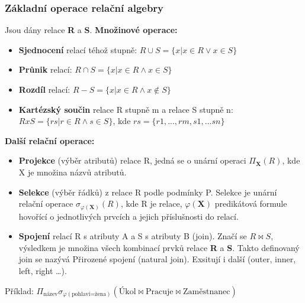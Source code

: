 \subsubsection{Základní operace relační algebry}
Jsou dány relace \textbf{R} a \textbf{S}. \textbf{Množinové operace:}
\begin{itemize}
\item \textbf{Sjednocení} relací téhož stupně:      $R \cup S = \{x | x \in R \vee x \in S\}$
\item \textbf{Průnik} relací:                                 $R \cap S = \{x | x \in R \wedge x \in S\}$
\item \textbf{Rozdíl} relací:                                   $R  -  S = \{x | x \in R \wedge x \notin S\}$
\item \textbf{Kartézský součin} relace R stupně m a relace S stupně n: $R x S = \{rs | r \in R \wedge s \in S\}$,  kde  $rs = \{r1,...,rm,s1,...sn\}$
\end{itemize}
\textbf{Další relační operace: }
\begin{itemize}
\item \textbf{Projekce} (výběr atributů) relace R, jedná se o unární operaci $\Pi_\mathbf{X}( R )$, kde X je množina názvů atributů.
\item \textbf{Selekce} (výběr řádků) z relace R podle podmínky P. Selekce je unární relační operace $\sigma_{\varphi(\mathbf{X})}( R )$, kde R je relace, $\varphi(\mathbf{X})$ predikátová formule hovořící o jednotlivých prvcích a jejich příslušnosti do relací.
\item \textbf{Spojení} relací R s atributy A  a  S  s atributy  B (join).  Značí se $R \bowtie S$, výsledkem je množina všech kombinací prvků relace \textbf{R} a \textbf{S}. Takto definovaný join se nazývá Přirozené spojení (natural join). Exsitují i další (outer, inner, left, right \ldots).
\end{itemize}

Příklad: $\Pi_\text{název} \sigma_{\varphi(\text{pohlaví=žena})} (\text{Úkol}\bowtie\text{Pracuje}\bowtie\text{Zaměstnanec})$


